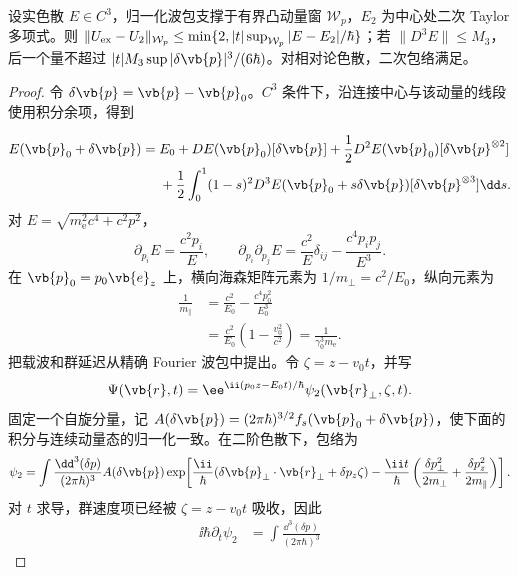 \begin{proposition}[实谱乘法传播子的二次截断界]
设实色散 $E\in C^3$，归一化波包支撑于有界凸动量窗 $\mathcal W_p$，$E_2$ 为中心处二次 Taylor 多项式。则 $\|U_{\rm ex}-U_2\|_{\mathcal W_p}\le\min\{2,|t|\sup_{\mathcal W_p}|E-E_2|/\hbar\}$；若 $\|D^3E\|\le M_3$，后一个量不超过 $|t|M_3\sup|\delta\vb{p}|^3/(6\hbar)$。对相对论色散，二次包络满足。
\end{proposition}
\begin{proof}
令 $\delta\vb{p}=\vb{p}-\vb{p}_0$。$C^3$ 条件下，沿连接中心与该动量的线段使用积分余项，得到

\begin{align*}
E(\vb{p}_0+\delta\vb{p})
={}&E_0+DE(\vb{p}_0)[\delta\vb{p}]
+\frac12D^2E(\vb{p}_0)[\delta\vb{p}^{\otimes2}]\\
&+\frac12\int_0^1(1-s)^2
D^3E(\vb{p}_0+s\delta\vb{p})[\delta\vb{p}^{\otimes3}]\dd s.
\end{align*}
对 $E=\sqrt{m_{\mathrm e}^2c^4+c^2p^2}$，
\begin{equation*}
\partial_{p_i}E=\frac{c^2p_i}{E},
\qquad
\partial_{p_i}\partial_{p_j}E
=\frac{c^2}{E}\delta_{ij}-\frac{c^4p_ip_j}{E^3}.
\end{equation*}
在 $\vb{p}_0=p_0\vb{e}_z$ 上，横向海森矩阵元素为 $1/m_\perp=c^2/E_0$，纵向元素为
\begin{align*}
\frac1{m_\parallel}
&=\frac{c^2}{E_0}-\frac{c^4p_0^2}{E_0^3}\\
&=\frac{c^2}{E_0}\left(1-\frac{v_0^2}{c^2}\right)
=\frac{1}{\gamma_0^3m_{\mathrm e}}.
\end{align*}
把载波和群延迟从精确 Fourier 波包中提出。令 $\zeta=z-v_0t$，并写
\begin{equation*}
\Psi(\vb{r},t)
=\ee^{\ii(p_0z-E_0t)/\hbar}
\psi_2(\vb{r}_\perp,\zeta,t).
\end{equation*}
固定一个自旋分量，记 $A(\delta\vb{p})=(2\pi\hbar)^{3/2}f_s(\vb{p}_0+\delta\vb{p})$，使下面的积分与连续动量态的归一化一致。在二阶色散下，包络为
\begin{equation*}
\psi_2
=\int\frac{\dd^3(\delta p)}{(2\pi\hbar)^3}
A(\delta\vb{p})
\exp\!\left[
\frac{\ii}{\hbar}(\delta\vb{p}_\perp\cdot\vb{r}_\perp+\delta p_z\zeta)
-\frac{\ii t}{\hbar}
\left(\frac{\delta p_\perp^2}{2m_\perp}
+\frac{\delta p_z^2}{2m_\parallel}\right)\right].
\end{equation*}
对 $t$ 求导，群速度项已经被 $\zeta=z-v_0t$ 吸收，因此
\begin{align*}
\ii\hbar\partial_t\psi_2
&=\int\frac{\dd^3(\delta p)}{(2\pi\hbar)^3}

\end{align*}
\end{proof}
